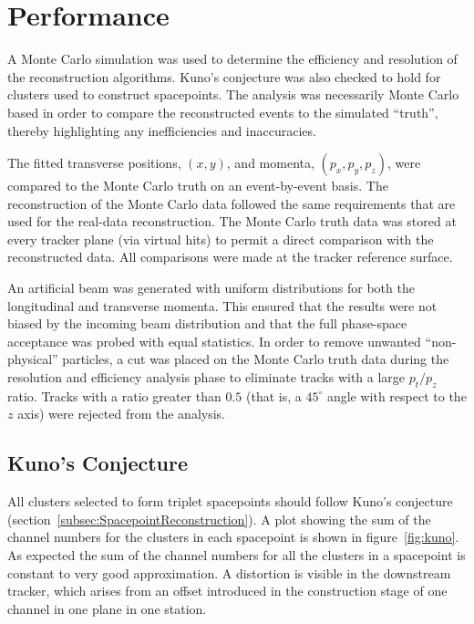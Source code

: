 \section{Performance}
\label{sec:Performance}

  A Monte Carlo simulation was used to determine the efficiency and resolution of the reconstruction algorithms. Kuno's conjecture was also checked to hold for clusters used to construct spacepoints. The analysis was necessarily Monte Carlo based in order to compare the reconstructed events to the simulated ``truth'', thereby highlighting any inefficiencies and inaccuracies.

  The fitted transverse positions, $(x,y)$, and momenta, $(p_x, p_y, p_z)$, were compared to the Monte Carlo truth on an event-by-event basis. The reconstruction of the Monte Carlo data followed the same requirements that are used for the real-data reconstruction. The Monte Carlo truth data was stored at every tracker plane (via virtual hits) to permit a direct comparison with the reconstructed data. All comparisons were made at the tracker reference surface. %

  An artificial beam was generated with uniform distributions for both the longitudinal and transverse momenta. This ensured that the results were not biased by the incoming beam distribution and that the full  phase-space acceptance was probed with equal statistics. In order to remove unwanted ``non-physical'' particles, a cut was placed on the Monte Carlo truth data during the resolution and efficiency analysis phase to eliminate tracks with a large $p_t/p_z$ ratio. Tracks with a ratio greater than $0.5$ (that is, a $45^\circ$ angle with respect to the $z$ axis) were rejected from the analysis.
 
 
  \subsection{Kuno's Conjecture}
  \label{sec:performance:kunos_conjecture} 
  All clusters selected to form triplet spacepoints should follow Kuno's conjecture (section~\ref{subsec:SpacepointReconstruction}). A plot showing the sum of the channel numbers for the clusters in each spacepoint is shown in figure~\ref{fig:kuno}. As expected the sum of the channel numbers for all the clusters in a spacepoint is constant to very good approximation. A distortion is visible in the downstream tracker, which arises from an offset introduced in the construction stage of one channel in one plane in one station. 
  

